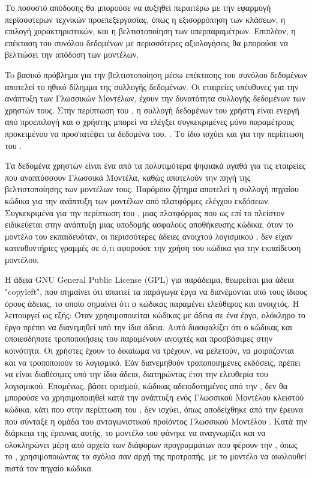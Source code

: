 Το ποσοστό απόδοσης θα μπορούσε να αυξηθεί περαιτέρω με την εφαρμογή
περίσσοτερων
τεχνικών προεπεξεργασίας, όπως η εξισορρόπηση των κλάσεων, η επιλογή
χαρακτηριστικών, και η βελτιστοποίηση των υπερπαραμέτρων. Επιπλέον, η
επέκταση του συνόλου δεδομένων με περισσότερες αξιολογήσεις θα μπορούσε
να βελτιώσει την απόδοση των μοντέλων.

To βασικό πρόβλημα για την βελτιστοποίηση μέσω επέκτασης του συνόλου
δεδομένων αποτελεί το ηθικό δίλημμα της
συλλογής δεδομένων. Οι εταιρείες υπέυθυνες για την ανάπτυξη των
Γλωσσικών Μοντέλων, έχουν την δυνατότητα συλλογής δεδομένων των
χρηστών τους. Στην περίπτωση του , η συλλογή
δεδομένων του χρήστη είναι ενεργή από προεπιλογή και ο χρήστης μπορεί
να ελέγξει συγκεκριμένες μόνο παραμέτρους προκειμένου να προστατέψει
τα δεδομένα του. \cite{ghcpdatacollection}. Το ίδιο ισχύει και για
την περίπτωση του  \cite{openaidatacollection}.

Tα δεδομένα χρηστών είναι ένα από τα πολυτιμότερα ψηφιακά αγαθά για
τις εταιρείες που αναπτύσσουν Γλωσσικά Μοντέλα, καθώς αποτελούν την
πηγή της βελτιστοποίησης των μοντέλων τους. Παρόμοιο ζήτημα αποτελεί
η συλλογή πηγαίου κώδικα για την ανάπτυξη των μοντέλων από πλατφόρμες
ελέγχου εκδόσεων. Συγκεκριμένα για την περίπτωση του ,
μιας πλατφόρμας που ως επί το πλείστον ειδικεύεται στην ανάπτυξη μιας
υποδομής ασφαλούς αποθήκευσης κώδικα, όταν το μοντέλο του  εκπαιδευόταν,
οι περισσότερες άδειες ανοιχτού λογισμικού
\cite{freesoftwaredef,ossdef,debian}, δεν είχαν κατευθυντήριες
γραμμές σε ό,τι αφορούσε την χρήση του κώδικα για την εκπαίδευση
μοντέλου.

Η άδεια \textlatin{GNU General Public License (GPL)} για παράδειμα,
θεωρείται μια άδεια \textlatin{"copyleft"}, που σημαίνει ότι απαιτεί
τα παράγωγα έργα να διανέμονται υπό τους ίδιους όρους άδειας, το
οποίο σημαίνει ότι ο κώδικας παραμένει ελεύθερος και ανοιχτός.
Η  λειτουργεί ως εξής: Όταν χρησιμοποιείται κώδικας με άδεια  σε
ένα έργο, ολόκληρο το έργο πρέπει να διανεμηθεί υπό την ίδια άδεια.
Αυτό διασφαλίζει ότι ο κώδικας και οποιεσδήποτε τροποποιήσεις του
παραμένουν ανοιχτές και προσβάσιμες στην κοινότητα. Οι χρήστες έχουν
το δικαίωμα να τρέχουν, να μελετούν, να μοιράζονται και να
τροποποιούν το λογισμικό. Εάν διανεμηθούν τροποποιημένες εκδόσεις,
πρέπει να είναι διαθέσιμες υπό την ίδια άδεια, διατηρώντας έτσι
την ελευθερία του λογισμικού. Eπομένως, βάσει ορισμού, κώδικας
αδειοδοτημένος από την , δεν θα μπορούσε να χρησιμοποιηθεί
κατά την ανάπτυξη ενός Γλωσσικού Μοντέλου κλειστού κώδικα, κάτι που
στην περίπτωση του , δεν ισχύει, όπως αποδείχθηκε
από την έρευνα που σύνταξε η ομάδα του ανταγωνιστικού προϊόντος
Γλωσσικού Μοντέλου  \cite{codeiumghcp,forbes2024codeium}.
Κατά την διάρκεια της έρευνας αυτής, το μοντέλο του  φάνηκε να
αναγνωρίζει και να ολοκληρώνει μέρη από αρχεία των διάφορων
προγραμμάτων που φέρουν την , όπως το ,
χρησιμοποιώντας τα σχόλια σαν αρχή της προτροπής, με το μοντέλο να
ακολουθεί πιστά τον πηγαίο κώδικα.

